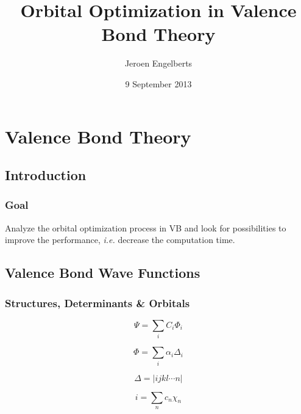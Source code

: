 \documentclass[]{beamer}
\title{Orbital Optimization in Valence Bond Theory}
\author{Jeroen Engelberts}
\date{9 September 2013}
\begin{document}
\begin{frame}
  \titlepage
\end{frame}

\section[Outline]{}

\begin{frame}
  \tableofcontents
\end{frame}


\section{Valence Bond Theory}
\subsection{Introduction}
\begin{frame}
  \frametitle{Goal}   %
  Analyze the orbital optimization process in VB and look for possibilities to improve the performance, \textit{i.e.} decrease the computation time.
\end{frame}

\subsection{Valence Bond Wave Functions}
\begin{frame}
  \frametitle{Structures, Determinants \& Orbitals}
  \begin{equation*}
    \Psi = \sum_{i} C_i \Phi_i
  \end{equation*}

  \begin{equation*}
    \Phi = \sum_{i} \alpha_i \Delta_i
  \end{equation*}

  \begin{equation*}
    \Delta = |ijkl \cdots n|
  \end{equation*}

  \begin{equation*}
    i = \sum_{n} c_n \chi_n
  \end{equation*}
\end{frame}
\end{document}

